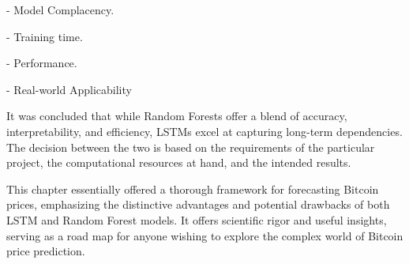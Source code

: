 -	Model Complacency.

-	Training time.

-	Performance.

-	Real-world Applicability

It was concluded that while Random Forests offer a blend of accuracy, interpretability, and efficiency, LSTMs excel at capturing long-term dependencies. The decision between the two is based on the requirements of the particular project, the computational resources at hand, and the intended results.

This chapter essentially offered a thorough framework for forecasting Bitcoin prices, emphasizing the distinctive advantages and potential drawbacks of both LSTM and Random Forest models. It offers scientific rigor and useful insights, serving as a road map for anyone wishing to explore the complex world of Bitcoin price prediction.

   

\def\baselinestretch{1.66}
\medskip

